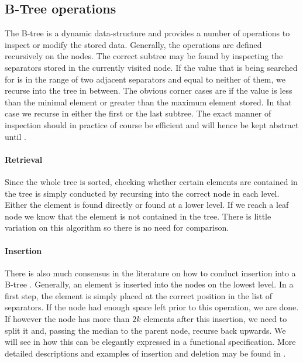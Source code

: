 \subsection{B-Tree operations}

The B-tree is a dynamic data-structure and provides
a number of operations to inspect or modify the stored data.
Generally, the operations are defined recursively on the nodes.
The correct subtree may be found by inspecting the separators stored
in the currently visited node.
If the value that is being searched for is in the range of two
adjacent separators and equal to neither of them,
we recurse into the tree in between. 
The obvious corner cases are if the value is less than the
minimal element or greater than the maximum element stored.
In that case we recurse in either the first or the last subtree.
The exact manner of inspection should in practice of course
be efficient and will hence be kept abstract until .

\paragraph{Retrieval}\label{par:intro-isin}
Since the whole tree is sorted,
checking whether certain elements are contained in the tree
is simply conducted by recursing into the correct node
in each level.
Either the element is found directly or found at a lower level.
If we reach a leaf node we know that the element is not contained in the tree.
There is little variation on this algorithm so there is no need for comparison.

\paragraph{Insertion}\label{par:intro-ins}
There is also much consensus in the literature on
how to conduct insertion into a B-tree \parencite{DBLP:journals/csur/Comer79}.
Generally, an element is inserted into the nodes on the lowest level.
In a first step, the element is simply placed at the correct
position in the list of separators.
If the node had enough space left prior to this operation,
we are done.
If however the node has more than $2k$ elements after this insertion,
we need to split it and, passing the median to the parent node,
recurse back upwards.
We will see in  how this can be
elegantly expressed in a functional specification.
More detailed descriptions and examples of insertion and deletion may be found
in \parencite{DBLP:books/daglib/0023376}.

